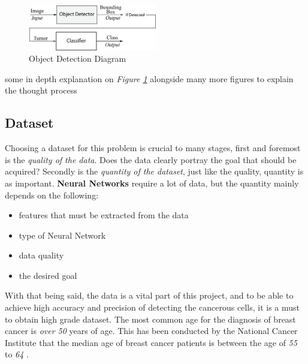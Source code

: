 \documentclass[12pt]{extarticle}
\begin{document}
	\begin{figure}[h]
		\centering
		\includegraphics[width=0.5\textwidth]{pics/Figures/Hierarchical_Obj_Det_Block_Diagram.eps}
		\caption{\small{Object Detection Diagram}}
		\label{fig:Hierarchical Obj Detector}
	\end{figure}
	some in depth explanation on \emph{Figure \ref{fig:Hierarchical Obj Detector}} alongside many more figures to explain the thought process 
	\subsection{Dataset}\label{Data}
	
	Choosing a dataset for this problem is crucial to many stages, first and foremost is the \emph{quality of the data}. Does the data clearly portray the goal that should be acquired? Secondly is the \emph{quantity of the dataset}, just like the quality, quantity is as important. \textbf{Neural Networks} require a lot of data, but the quantity mainly depends on the following:
	\begin{itemize}
		\item features that must be extracted from the data
		\item type of Neural Network
		\item data quality
		\item the desired goal
	\end{itemize}
	With that being said, the data is a vital part of this project, and to be able to achieve high accuracy and precision of detecting the cancerous cells, it is a must to obtain high grade dataset. 
	The most common age for the diagnosis of breast cancer is \emph{over 50} years of age. This has been conducted by the National Cancer Institute that the median age of breast cancer patients is between the age of \emph{55} to \emph{64} \cite{CDC}. 
	\\[5mm]
	
\end{document}
